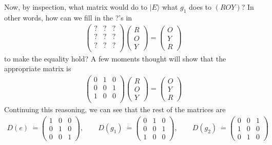 \documentclass[12pt,epsf]{article}
\def\nolabel{\nonumber }
\def\nolabel{\nonumber }
\begin{document}
Now, by inspection, what matrix would do to $|E\rangle$ what $g_1$ does
to $(ROY)$?  In other words, how can we fill in the ?'s in 
\begin{eqnarray}
\begin{pmatrix}
? & ? & ? \\
? & ? & ? \\
? & ? & ? \\
\end{pmatrix}
\begin{pmatrix}
R \\ O \\ Y
\end{pmatrix} = 
\begin{pmatrix}
O \\ Y \\ R
\end{pmatrix}  \nolabel
\end{eqnarray}
to make the equality hold?  A few moments thought will show that the
appropriate matrix is
\begin{eqnarray}
\begin{pmatrix}
0 & 1 & 0 \\
0 & 0 & 1 \\
1 & 0 & 0 \\
\end{pmatrix}
\begin{pmatrix}
R \\ O \\ Y
\end{pmatrix} = 
\begin{pmatrix}
O \\ Y \\ R
\end{pmatrix} \nolabel
\end{eqnarray}
Continuing this reasoning, we can see that the rest of the matrices are
\begin{eqnarray}
D(e)~\dot{=} 
\begin{pmatrix}
1 & 0 & 0 \\ 0 & 1 & 0 \\ 0 & 0 & 1
\end{pmatrix},\qquad
D(g_1)~\dot{=} 
\begin{pmatrix}
0 & 1 & 0 \\ 0 & 0 & 1 \\ 1 & 0 & 0
\end{pmatrix},\qquad
D(g_2)~\dot{=} 
\begin{pmatrix}
0 & 0 & 1 \\ 1 & 0 & 0 \\ 0 & 1 & 0
\end{pmatrix}\qquad \nolabel
\end{eqnarray}
\end{document}
